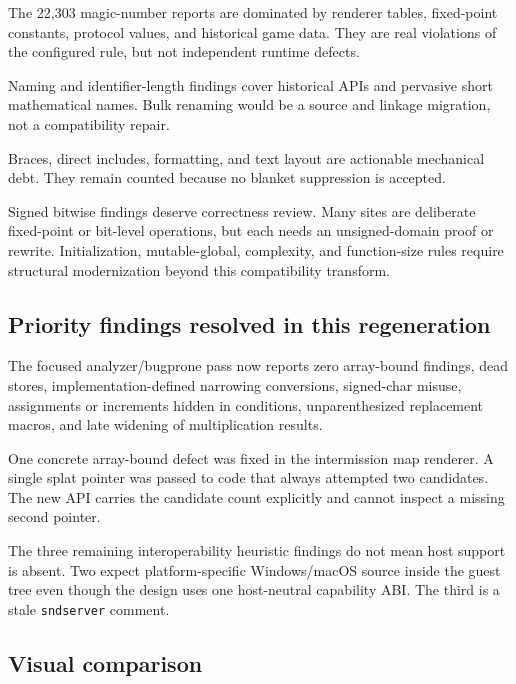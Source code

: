 \documentclass[11pt]{article}
\begin{document}
The 22,303 magic-number reports are dominated by renderer tables, fixed-point
constants, protocol values, and historical game data. They are real violations
of the configured rule, but not independent runtime defects.

Naming and identifier-length findings cover historical APIs and pervasive
short mathematical names. Bulk renaming would be a source and linkage migration,
not a compatibility repair.

Braces, direct includes, formatting, and text layout are actionable mechanical
debt. They remain counted because no blanket suppression is accepted.

Signed bitwise findings deserve correctness review. Many sites are deliberate
fixed-point or bit-level operations, but each needs an unsigned-domain proof or
rewrite. Initialization, mutable-global, complexity, and function-size rules
require structural modernization beyond this compatibility transform.

\subsection*{Priority findings resolved in this regeneration}
The focused analyzer/bugprone pass now reports zero array-bound findings, dead
stores, implementation-defined narrowing conversions, signed-char misuse,
assignments or increments hidden in conditions, unparenthesized replacement
macros, and late widening of multiplication results.

One concrete array-bound defect was fixed in the intermission map renderer. A
single splat pointer was passed to code that always attempted two candidates.
The new API carries the candidate count explicitly and cannot inspect a missing
second pointer.

The three remaining interoperability heuristic findings do not mean host
support is absent. Two expect platform-specific Windows/macOS source inside the
guest tree even though the design uses one host-neutral capability ABI. The
third is a stale \texttt{sndserver} comment.

\subsection*{Visual comparison}
\begin{center}
\end{center}
\end{document}
